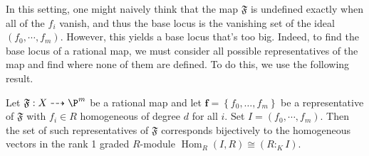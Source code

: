 \documentclass[11pt]{amsart}%
\numberwithin{equation}{theorem}
\renewcommand{\:}{\colon}
\DeclareMathOperator{\homgp}{Hom}
\DeclareMathOperator{\Projfnc}{Proj} %
\theoremstyle{theorem}
\begin{document}
In this setting, one might naively think that the map $\mathfrak{F}$ is undefined exactly when all of the $f_i$ vanish, and thus the base locus is the vanishing set of the ideal $(f_0, \cdots, f_m)$. However, this  yields a base locus that's too big.  Indeed, to find the base locus of a rational map, we must consider all possible representatives of the map and find where none of them are defined. To do this, we use the following result.



%

\begin{proposition}\textnormal{\cite[Proposition 1.1]{SimisCremona}}
  Let $\mathfrak{F}: X \dashrightarrow \P^m$ be a rational map and let $\textbf{f} = \left\{ f_0, \dots, f_m \right\}$ be a representative of $\mathfrak{F}$ with $f_i\in R$ homogeneous of degree $d$ for all $i$. Set $I  = (f_0, \cdots, f_m)$. Then the set of such representatives of $\mathfrak{F}$ corresponds bijectively to the homogeneous vectors in the rank 1 graded $R$-module $\homgp_R(I, R) \cong (R :_K I)$.
  \label{lemma:repsOfRatMap}
\end{proposition}
\end{document}

